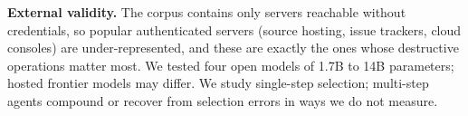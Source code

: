 \textbf{External validity.} The corpus contains only servers reachable without credentials, so
popular authenticated servers (source hosting, issue trackers, cloud consoles) are under-represented,
and these are exactly the ones whose destructive operations matter most. We tested four open models of
1.7B to 14B parameters; hosted frontier models may differ. We study single-step selection; multi-step agents compound or recover
from selection errors in ways we do not measure.
